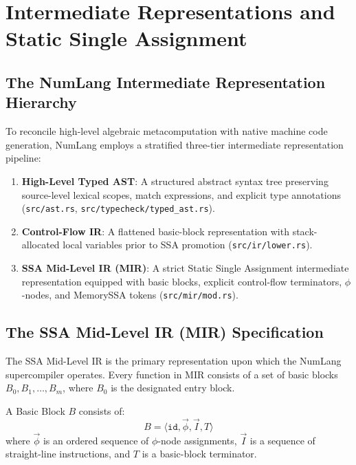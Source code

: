 \chapter{Intermediate Representations and Static Single Assignment}
\label{chap:ir}

\section{The NumLang Intermediate Representation Hierarchy}
\label{sec:ir:hierarchy}

To reconcile high-level algebraic metacomputation with native machine code generation, NumLang employs a stratified three-tier intermediate representation pipeline:
\begin{enumerate}
    \item \textbf{High-Level Typed AST}: A structured abstract syntax tree preserving source-level lexical scopes, match expressions, and explicit type annotations (\texttt{src/ast.rs}, \texttt{src/typecheck/typed\_ast.rs}).
    \item \textbf{Control-Flow IR}: A flattened basic-block representation with stack-allocated local variables prior to SSA promotion (\texttt{src/ir/lower.rs}).
    \item \textbf{SSA Mid-Level IR (MIR)}: A strict Static Single Assignment intermediate representation equipped with basic blocks, explicit control-flow terminators, $\phi$-nodes, and MemorySSA tokens (\texttt{src/mir/mod.rs}).
\end{enumerate}

\section{The SSA Mid-Level IR (MIR) Specification}
\label{sec:ir:mir_spec}

The SSA Mid-Level IR is the primary representation upon which the NumLang supercompiler operates. Every function in MIR consists of a set of basic blocks $B_0, B_1, \dots, B_m$, where $B_0$ is the designated entry block.

\begin{definition}
A Basic Block $B$ consists of:
\begin{equation}
B = \langle \mathtt{id}, \vec{\phi}, \vec{I}, T \rangle
\end{equation}
where $\vec{\phi}$ is an ordered sequence of $\phi$-node assignments, $\vec{I}$ is a sequence of straight-line instructions, and $T$ is a basic-block terminator.
\end{definition}

